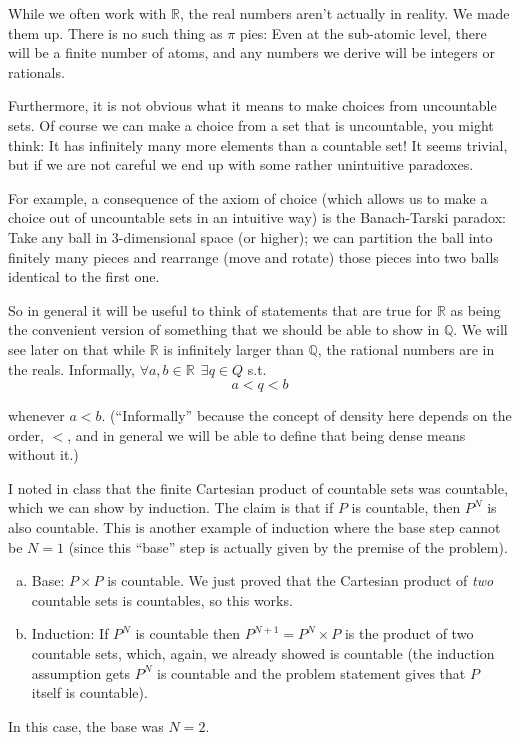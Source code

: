 \documentclass{article}
\begin{document}
\begin{tacomment}{1}
  While we often work with $\mathbb{R}$, the real numbers aren't actually in reality. We made them up. There is no such thing as $\pi$ pies: Even at the sub-atomic level, there will be a finite number of atoms, and any numbers we derive will be integers or rationals.

  Furthermore, it is not obvious what it means to make choices from uncountable sets.  Of course we can make a choice from a set that is uncountable, you might think: It has infinitely many more elements than a countable set! It seems trivial, but if we are not careful we end up with some rather unintuitive paradoxes.

  For example, a consequence of the axiom of choice (which allows us to make a choice out of uncountable sets in an intuitive way) is the Banach-Tarski paradox: Take any ball in 3-dimensional space (or higher); we can partition the ball into finitely many pieces and rearrange (move and rotate) those pieces into two balls identical to the first one.

  So in general it will be useful to think of statements that are true for $\mathbb{R}$ as being the convenient version of something that we should be able to show in $\mathbb{Q}$. We will see later on that while $\mathbb{R}$ is infinitely larger than $\mathbb{Q}$, the rational numbers are  in the reals. Informally, $\forall a, b \in \mathbb{R} ~~ \exists q \in Q$ s.t.
  \[
    a < q < b
  \]

  whenever $a < b$. (``Informally'' because the concept of density here depends on the order, $<$, and in general we will be able to define that being dense means without it.)
\end{tacomment}

\begin{remark}
  I noted in class that the finite Cartesian product of countable sets was countable, which we can show by induction. The claim is that if $P$ is countable, then $P^N$ is also countable. This is another example of induction where the base step cannot be $N = 1$ (since this ``base'' step is actually given by the premise of the problem).
  \begin{enumerate}[a)]
    \item Base: $P \times P$ is countable. We just proved that the Cartesian product of \textit{two} countable sets is countables, so this works.

    \item Induction: If $P^N$ is countable then $P^{N + 1} = P^N \times P$ is the product of two countable sets, which, again, we already showed is countable (the induction assumption gets $P^N$ is countable and the problem statement gives that $P$ itself is countable).
  \end{enumerate}

  In this case, the base was $N = 2$.
\end{remark}
\end{document}
